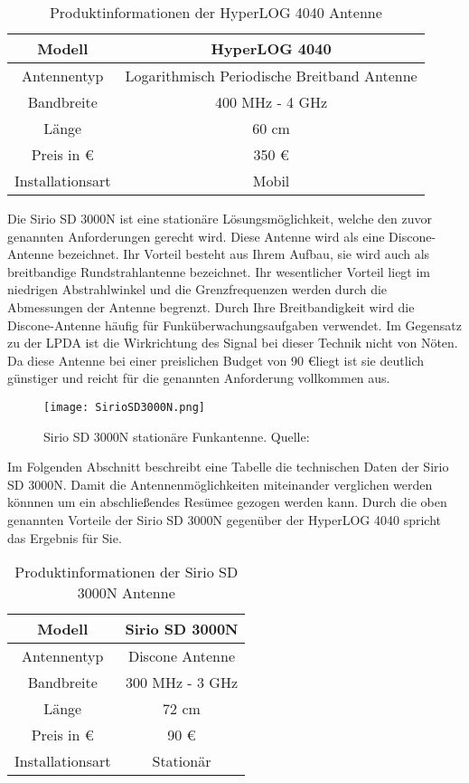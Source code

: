 \begin{table}[H]
	\centering
	\begin{tabular}{c|c}
		Modell & HyperLOG 4040\\
		\hline
		Antennentyp & Logarithmisch Periodische Breitband Antenne\\ 
		\hline 
		Bandbreite & 400 MHz - 4 GHz\\ 
		\hline 
		Länge &  60 cm\\ 
		\hline 
		Preis in \euro &  350 \euro \\ 
		\hline 
		Installationsart & Mobil\\ 
		
	\end{tabular} 
	\caption{Produktinformationen der HyperLOG 4040 Antenne}
\end{table}

Die Sirio SD 3000N ist eine stationäre Lösungsmöglichkeit, welche den zuvor genannten Anforderungen gerecht wird. Diese Antenne wird als eine Discone-Antenne bezeichnet. Ihr Vorteil besteht aus Ihrem Aufbau, sie wird auch als breitbandige Rundstrahlantenne bezeichnet. Ihr wesentlicher Vorteil liegt im niedrigen Abstrahlwinkel und die Grenzfrequenzen werden durch die Abmessungen der Antenne begrenzt. Durch Ihre Breitbandigkeit wird die Discone-Antenne häufig für Funküberwachungsaufgaben verwendet. Im Gegensatz zu der LPDA ist die Wirkrichtung des Signal bei dieser Technik nicht von Nöten. Da diese Antenne bei einer preislichen Budget von 90 \euro liegt ist sie deutlich günstiger und reicht für die genannten Anforderung vollkommen aus.


\begin{figure}[H]
	\centering
	\texttt{[image: SirioSD3000N.png]}
	\caption[Sirio SD 3000N stationäre Funkantenne]{Sirio SD 3000N stationäre Funkantenne. Quelle: \cite{Funktechnik:2018}} 
	\label{Sirio SD 3000N Antenne}
\end{figure}

Im Folgenden Abschnitt beschreibt eine Tabelle die technischen Daten der Sirio SD 3000N. Damit die Antennenmöglichkeiten miteinander verglichen werden könnnen um ein abschließendes Resümee gezogen werden kann. Durch die oben genannten Vorteile der Sirio SD 3000N gegenüber der HyperLOG 4040 spricht das Ergebnis für Sie. 

\begin{table}[H]
	\centering
	\begin{tabular}{c|c}
		Modell & Sirio SD 3000N\\
		\hline
		Antennentyp & Discone Antenne\\ 
		\hline 
		Bandbreite & 300 MHz - 3 GHz\\ 
		\hline 
		Länge &  72 cm\\ 
		\hline 
		Preis in \euro &  90 \euro \\ 
		\hline 
		Installationsart & Stationär\\ 
		
	\end{tabular} 
	\caption{Produktinformationen der Sirio SD 3000N Antenne}
\end{table}


